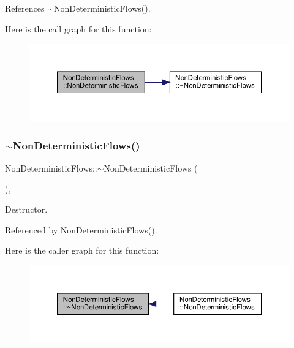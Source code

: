 References $\sim$\+Non\+Deterministic\+Flows().

Here is the call graph for this function\+:
\nopagebreak
\begin{figure}[H]
\begin{center}
\leavevmode
\includegraphics[width=350pt]{dd/d17/classNonDeterministicFlows_a2c17dbfcd2cd248e3b3b4f3c6b79aeb0_cgraph}
\end{center}
\end{figure}
\mbox{\label{classNonDeterministicFlows_ab5ab7e3093351601a2de3833ee1843f0}} 
\subsubsection{\texorpdfstring{$\sim$\+Non\+Deterministic\+Flows()}{~NonDeterministicFlows()}}
{\footnotesize\ttfamily Non\+Deterministic\+Flows\+::$\sim$\+Non\+Deterministic\+Flows (\begin{DoxyParamCaption}{ }\end{DoxyParamCaption})\hspace{0.3cm}{\ttfamily [override]}, {\ttfamily [default]}}



Destructor. 



Referenced by Non\+Deterministic\+Flows().

Here is the caller graph for this function\+:
\nopagebreak
\begin{figure}[H]
\begin{center}
\leavevmode
\includegraphics[width=350pt]{dd/d17/classNonDeterministicFlows_ab5ab7e3093351601a2de3833ee1843f0_icgraph}
\end{center}
\end{figure}


